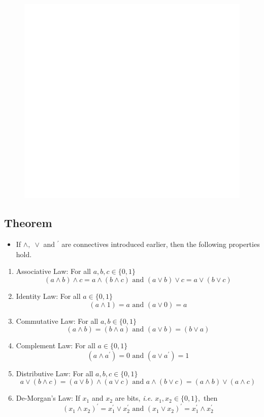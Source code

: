 \documentclass[]{book}
\providecommand{\tightlist}{%
  \setlength{\itemsep}{0pt}\setlength{\parskip}{0pt}}
\begin{document}
\begin{figure}

{\centering \includegraphics[width=1\linewidth]{figure/boxC49-1} 

}

\end{figure}

\hypertarget{theorem}{%
\subsection{Theorem}\label{theorem}}

\begin{itemize}
\tightlist
\item
  If \(\land, \; \lor\) and \(^\prime\) are connectives introduced earlier, then the following properties hold.
\end{itemize}

\begin{enumerate}
\def\labelenumi{(\roman{enumi})}
\item
  Associative Law: For all \(a,b,c \in \{0,1\}\)
  \[(a \land b) \land c = a \land (b\land c) \text{ and } (a \lor b) \lor c = a \lor (b\lor c)\]
\item
  Identity Law: For all \(a \in \{0,1\}\)
  \[(a \land 1)  = a  \text{ and } (a \lor 0)  = a\]
\item
  Commutative Law: For all \(a,b\in \{0,1\}\)
  \[(a \land b)  = (b \land a)  \text{ and } (a \lor b)  = (b \lor a)\]
\item
  Complement Law: For all \(a\in \{0,1\}\)
  \[(a \land a^\prime)  = 0 \text{ and } (a \lor a^\prime)  = 1\]
\item
  Distributive Law: For all \(a,b,c\in \{0,1\}\)
  \[a \lor (b\land c) = (a \lor b) \land (a \lor c)  \text{ and }  a \land (b\lor c)= (a \land b) \lor (a \land c)\]
\item
  De-Morgan's Law: If \(x_1\) and \(x_2\) are bits, \emph{i.e.} \(x_1, x_2\in \{0,1\},\) then
  \[(x_1 \land x_2)^\prime = x_1^\prime \lor x_2^\prime  \text{ and }  (x_1 \lor x_2)^\prime = x_1^\prime \land x_2^\prime \]
\end{enumerate}
\end{document}
